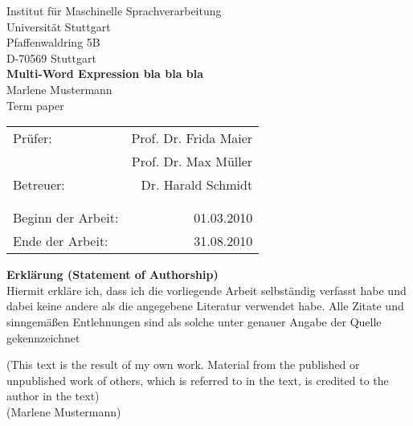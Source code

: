 \documentclass[12pt,leqno,a4paper]{article}
\newcommand{\Titel}{Multi-Word Expression bla bla bla}
\begin{document}
\begin{titlepage}
  \large
  \begin{center}
    Institut f\"ur Maschinelle Sprachverarbeitung\\
    Universit\"at Stuttgart\\
    Pfaffenwaldring 5B\\
    D-70569 Stuttgart\\    
      \vfill
    {\LARGE \bf \Titel} \\
    \vspace{2cm}
    Marlene Mustermann\\
    Term paper 
      \vfill
    \begin{tabular}[t]{lr}
    {Pr\"ufer:} & Prof. Dr. Frida Maier\\
     & Prof. Dr. Max M\"uller\\
    {Betreuer:} & Dr. Harald Schmidt\\ 
    \\
    \\
    {Beginn der Arbeit:} & 01.03.2010\\
    {Ende der Arbeit:} & 31.08.2010\\
    \end{tabular}
  \end{center}

  \normalsize
\end{titlepage}

\newpage
\thispagestyle{empty}


\noindent\textbf{Erkl\"arung (Statement of Authorship)}\\


\noindent Hiermit erkl\"are ich, dass ich die vorliegende Arbeit selbst\"andig verfasst habe und dabei keine andere als die angegebene Literatur verwendet habe. Alle Zitate und sinngem\"a\ss{}en Entlehnungen sind als solche unter genauer Angabe der Quelle gekennzeichnet

\noindent (This text is the result of my own work. Material from the published or unpublished work of others, which is referred to in the text, is credited to the author in the text)\\[2cm]


\noindent (Marlene Mustermann)


\newpage

\tableofcontents
\newpage



















\end{document}
